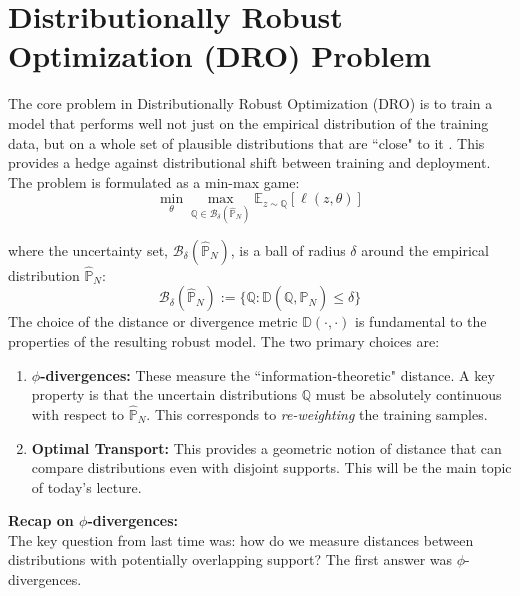 \documentclass[12pt]{report}
\newcommand{\coloneqq}{\mathrel{:=}}
\begin{document}
\maketitle

\section{Distributionally Robust Optimization (DRO) Problem}
The core problem in Distributionally Robust Optimization (DRO) is to train a model that performs well not just on the empirical distribution of the training data, 
but on a whole set of plausible distributions that are ``close" to it \cite{blanchet2024distributionally}. 
This provides a hedge against distributional shift between training and deployment. The problem is formulated as a min-max game:
\[
    \min_{\theta} \max_{\mathbb{Q} \in \mathcal{B}_\delta(\hat{\mathbb{P}}_N)} \mathbb{E}_{z \sim \mathbb{Q}} [\ell(z,\theta)]
\]

where the uncertainty set, $\mathcal{B}_\delta(\hat{\mathbb{P}}_N)$, is a ball of radius $\delta$ around the empirical distribution 
$\hat{\mathbb{P}}_N$:
\[
\mathcal{B}_\delta(\hat{\mathbb{P}}_N) \coloneqq \{ \mathbb{Q}:\mathbb{D}(\mathbb{Q}, \hat{\mathbb{P}}_N)\leq \delta \}
\]
The choice of the distance or divergence metric $\mathbb{D}(\cdot, \cdot)$ is fundamental to the properties of the resulting robust model. 
The two primary choices are:
\begin{enumerate}
    \item \textbf{$\phi$-divergences:} These measure the ``information-theoretic" distance. 
    A key property is that the uncertain distributions $\mathbb{Q}$ must be absolutely continuous with respect to $\hat{\mathbb{P}}_N$. 
    This corresponds to \textit{re-weighting} the training samples.
    \item \textbf{Optimal Transport:} This provides a geometric notion of distance that can compare distributions even with disjoint supports. 
    This will be the main topic of today's lecture.
\end{enumerate}

\noindent\textbf{Recap on $\phi$-divergences:}\\
The key question from last time was: how do we measure distances between distributions with potentially overlapping support? 
The first answer was $\phi$-divergences.
\end{document}
